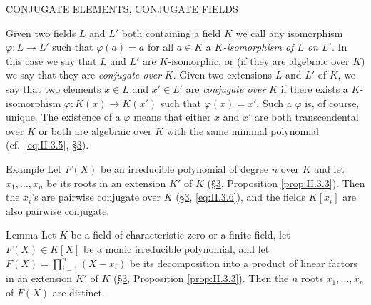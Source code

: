 %
        {CONJUGATE ELEMENTS, CONJUGATE FIELDS}

Given two fields $L$ and $L'$ both containing a field $K$ we call any
isomorphism $\varphi:L\to L'$ such that $\varphi(a)=a$ for all $a\in K$ a
\emph{$K$-isomorphism of $L$ on $L'$}. In this case we say that $L$ and $L'$
are $K$-isomorphic, or (if they are algebraic over $K$) we say that they are
\emph{conjugate over} $K$. Given two extensions $L$ and $L'$ of $K$, we say
that two elements $x\in L$ and $x'\in L'$ are \emph{conjugate over} $K$ if
there exists a $K$-isomorphism $\varphi:K(x)\to K(x')$ such that
$\varphi(x)=x'$. Such a $\varphi$ is, of course, unique. The existence of a
$\varphi$ means that either $x$ and $x'$ are both transcendental over $K$ or
both are algebraic over $K$ with the same minimal polynomial (cf.\
\eqref{eq:II.3.5}, \hyperref[sec:2.3]{§3}).

\begin{statement}{Example}
Let $F(X)$ be an irreducible polynomial of degree $n$ over $K$ and let
$x_{1},\ldots,x_{n}$ be its roots in an extension $K'$ of $K$ (\hyperref[sec:2.3]{§3},
Proposition \ref{prop:II.3.3}). Then the $x_{i}$'s are pairwise conjugate
over $K$ (\hyperref[sec:2.3]{§3}, \eqref{eq:II.3.6}), and the fields $K[x_{i}]$ are also
pairwise conjugate.
\end{statement}

\begin{statement}{Lemma}
Let $K$ be a field of characteristic zero or a finite field, let
$F(X)\in K[X]$ be a monic irreducible polynomial, and let
$F(X)=\prod_{i=1}^{n}(X-x_{i})$ be its decomposition into a product of
linear factors in an extension $K'$ of $K$ (\hyperref[sec:2.3]{§3}, Proposition
\ref{prop:II.3.3}). Then the $n$ roots $x_{1},\ldots,x_{n}$ of $F(X)$ are
distinct.
\end{statement}

